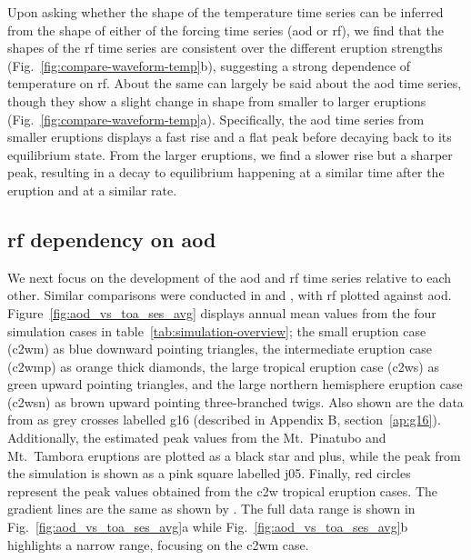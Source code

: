 \documentclass{ametsocV6.1}
\begin{document}
Upon asking whether the shape of the temperature time series can be inferred from the
shape of either of the forcing time series (\gls{aod} or \gls{rf}), we find that the
shapes of the \gls{rf} time series are consistent over the different eruption strengths
(Fig.~\ref{fig:compare-waveform-temp}b), suggesting a strong dependence of temperature
on \gls{rf}. About the same can largely be said about the \gls{aod} time series, though
they show a slight change in shape from smaller to larger eruptions
(Fig.~\ref{fig:compare-waveform-temp}a). Specifically, the \gls{aod} time series from
smaller eruptions displays a fast rise and a flat peak before decaying back to its
equilibrium state. From the larger eruptions, we find a slower rise but a sharper peak,
resulting in a decay to equilibrium happening at a similar time after the eruption and
at a similar rate.

\subsection{\gls{rf} dependency on \gls{aod}}

We next focus on the development of the \gls{aod} and \gls{rf} time series relative to
each other. Similar comparisons were conducted in \citet[][their Fig.\ 4]{gregory2016}
and \citet[][their Fig.\ 1]{marshall2020}, with \gls{rf} plotted against \gls{aod}.
Figure~\ref{fig:aod_vs_toa_ses_avg} displays annual mean values from the four simulation
cases in table~\ref{tab:simulation-overview}; the small eruption case (\gls{c2wm}) as
blue downward pointing triangles, the intermediate eruption case (\gls{c2wmp}) as orange
thick diamonds, the large tropical eruption case (\gls{c2ws}) as green upward pointing
triangles, and the large northern hemisphere eruption case (\gls{c2wsn}) as brown upward
pointing three-branched twigs. Also shown are the data from \citet[][Fig.\ 4, black
  crosses from HadCM3 sstPiHistVol]{gregory2016} as grey crosses labelled \gls{g16}
(described in Appendix B, section~\ref{ap:g16}). Additionally, the estimated peak values
from the Mt.\ Pinatubo and Mt.\ Tambora eruptions are plotted as a black star and plus,
while the peak from the \citet{jones2005} simulation is shown as a pink square labelled
\gls{j05}. Finally, red circles represent the peak values obtained from the \gls{c2w}
tropical eruption cases. The gradient lines are the same as shown by
\citet{gregory2016}. The full data range is shown in Fig.~\ref{fig:aod_vs_toa_ses_avg}a
while Fig.~\ref{fig:aod_vs_toa_ses_avg}b highlights a narrow range, focusing on the
\gls{c2wm} case.
\end{document}

